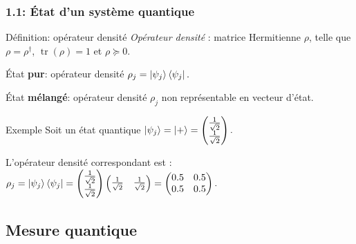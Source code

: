 \documentclass{beamer}
\DeclareMathOperator{\tr}{tr}
\begin{document}
\begin{frame}
    \frametitle{1.1: \'Etat d'un système quantique}
    \small

    \begin{block}{Définition: opérateur densité}
        \textit{Opérateur densité} : matrice Hermitienne $\rho$, telle que $\rho = \rho^{\dagger}$, $\tr(\rho) = 1$ et $\rho \succeq 0$.
    \end{block}

    \pause

    \begin{block}{}

        \'Etat \textbf{pur}: opérateur densité $\rho_j = \ket{\psi_j} \bra{\psi_j}.$
        \medbreak

        \'Etat \textbf{mélangé}: opérateur densité $\rho_j$ non représentable en vecteur d'état.
    \end{block}

    \pause

    \begin{block}{Exemple}
        Soit un état quantique $\ket{\psi_j} = \ket{+} = 
        \begin{pmatrix}
            \frac{1}{\sqrt{2}} \\ \frac{1}{\sqrt{2}}
        \end{pmatrix}.$

        L'opérateur densité correspondant est : $\rho_j = \ket{\psi_j}\bra{\psi_j} =\begin{pmatrix} \frac{1}{\sqrt{2}} \\ \frac{1}{\sqrt{2}} \end{pmatrix} \begin{pmatrix} \frac{1}{\sqrt{2}} & \frac{1}{\sqrt{2}} \end{pmatrix} = \begin{pmatrix} 0.5 & 0.5 \\ 0.5 & 0.5 \end{pmatrix}. \nonumber
        $
    \end{block}
\end{frame}

\subsection{Mesure quantique}
\end{document}
